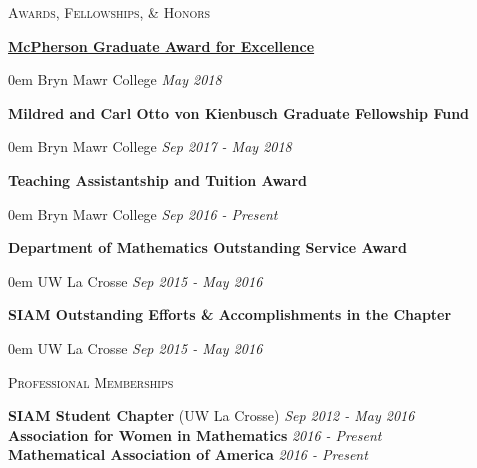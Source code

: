 \documentclass[11pt]{article}
\newenvironment{headitem}[2]{\hspace{.5em} \textbf{#1} \hfill #2 \begin{addmargin}[0em]{0em}}{\end{addmargin}}
\renewenvironment{section}[1]{\textsc{\large #1} \vskip5pt}{\vskip10pt}
\newcommand{\itemdate}[2]{\hspace{.5em} #1 \hfill \textit{#2} \\}
\begin{document}
\begin{section}{Awards, Fellowships, \& Honors}
	
	\begin{headitem}{\href{https://www.brynmawr.edu/president/mcpherson-award-excellence}{McPherson Graduate Award for Excellence}}{}
		\itemdate{Bryn Mawr College}{May 2018}
	\end{headitem}
	\vskip5pt
	
	\begin{headitem}{Mildred and Carl Otto von Kienbusch Graduate Fellowship Fund}{}
		\itemdate{Bryn Mawr College}{Sep 2017 - May 2018}
	\end{headitem}
	\vskip5pt
	
	\begin{headitem}{Teaching Assistantship and Tuition Award}{}
		\itemdate{Bryn Mawr College}{Sep 2016 - Present}
	\end{headitem}
	\vskip5pt
	
	\begin{headitem}{Department of Mathematics Outstanding Service Award}{}
		\itemdate{UW La Crosse}{Sep 2015 - May 2016}
	\end{headitem}
	\vskip5pt
	
	\begin{headitem}{SIAM Outstanding Efforts \& Accomplishments in the Chapter}{}
		\itemdate{UW La Crosse}{Sep 2015 - May 2016}
	\end{headitem}
	
\end{section}



\begin{section}{Professional Memberships}
	
	\itemdate{\textbf{SIAM Student Chapter} (UW La Crosse)}{Sep 2012 - May 2016}
	\itemdate{\textbf{Association for Women in Mathematics}}{2016 - Present}
	\itemdate{\textbf{Mathematical Association of America}}{2016 - Present}
	
\end{section}

		
\end{document}
